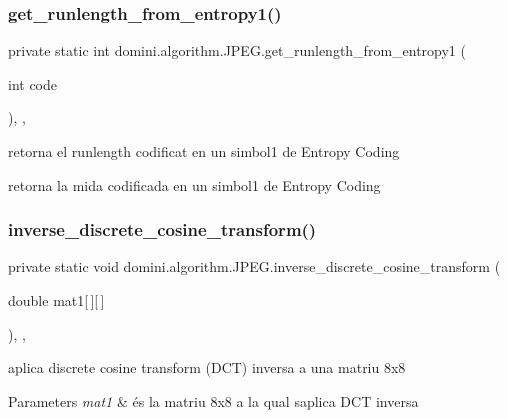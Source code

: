 \subsubsection{\texorpdfstring{get\+\_\+runlength\+\_\+from\+\_\+entropy1()}{get\_runlength\_from\_entropy1()}}
{\footnotesize\ttfamily private static int domini.\+algorithm.\+J\+P\+E\+G.\+get\+\_\+runlength\+\_\+from\+\_\+entropy1 (\begin{DoxyParamCaption}\item[{int}]{code }\end{DoxyParamCaption})\hspace{0.3cm}{\ttfamily [inline]}, {\ttfamily [static]}, {\ttfamily [private]}}



retorna el runlength codificat en un simbol1 de Entropy Coding 

retorna la mida codificada en un simbol1 de Entropy Coding \mbox{\label{classdomini_1_1algorithm_1_1JPEG_a3a6e16b0ee34746e4b0118ed9107bd75}} 
\subsubsection{\texorpdfstring{inverse\+\_\+discrete\+\_\+cosine\+\_\+transform()}{inverse\_discrete\_cosine\_transform()}}
{\footnotesize\ttfamily private static void domini.\+algorithm.\+J\+P\+E\+G.\+inverse\+\_\+discrete\+\_\+cosine\+\_\+transform (\begin{DoxyParamCaption}\item[{double}]{mat1\mbox{[}$\,$\mbox{]}\mbox{[}$\,$\mbox{]} }\end{DoxyParamCaption})\hspace{0.3cm}{\ttfamily [inline]}, {\ttfamily [static]}, {\ttfamily [private]}}



aplica discrete cosine transform (D\+CT) inversa a una matriu 8x8 


\begin{DoxyParams}{Parameters}
{\em mat1} & és la matriu 8x8 a la qual s\textquotesingle{}aplica D\+CT inversa \\
\hline
\end{DoxyParams}
\mbox{\label{classdomini_1_1algorithm_1_1JPEG_a02fa1a8d05204b71cf6d5e8d6bbd3d2b}} 
